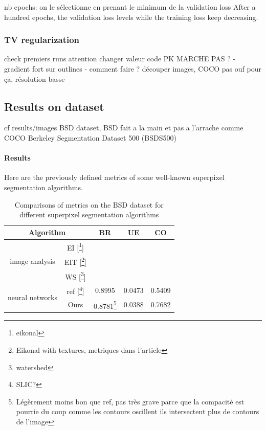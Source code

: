 \documentclass{article}
\begin{document}
            nb epochs: on le sélectionne en prenant le minimum de la validation loss
            After a hundred epochs, the validation loss levels while the training loss keep decreasing.
        \subsubsection{TV regularization}
        check premiers runs
            attention changer valeur code
            PK MARCHE PAS ?
            - gradient fort sur outlines
            - comment faire ? découper images, COCO pas ouf pour ça, résolution basse

    \subsection{Results on dataset}
    cf results/images
    BSD dataset, BSD fait a la main et pas a l'arrache comme COCO
     Berkeley Segmentation Dataset 500 (BSDS500)\cite{arbelaez2011}

        \paragraph{Results}
        Here are the previously defined metrics of some well-known superpixel segmentation algorithms.
        \begin{table}[!ht]
            \centering
            \begin{tabular}{|c|c|ccc|}
                \hline
                \multicolumn{2}{|c|}{Algorithm} & BR & UE & CO\\
                \hline
                \hline
                \multirow{3}{*}{image analysis} & EI [\footnote{eikonal}] & & & \\
                & EIT [\footnote{Eikonal with textures, metriques dans l'article}] & & & \\
                & WS [\footnote{watershed}] & & & \\
                \hline
                \multirow{2}{*}{neural networks} & ref [\footnote{SLIC?}] & 0.8995 & 0.0473 & 0.5409\\
                & Ours & 0.8781\footnote{Légèrement moins bon que ref, pas très grave parce que la compacité est pourrie du coup comme les contours oscillent ils intersectent plus de contours de l'image} & 0.0388 & 0.7682\\
                \hline
            \end{tabular}
            \caption{Comparisons of metrics on the BSD dataset for different
            superpixel segmentation algorithms}
        \end{table}
\end{document}
